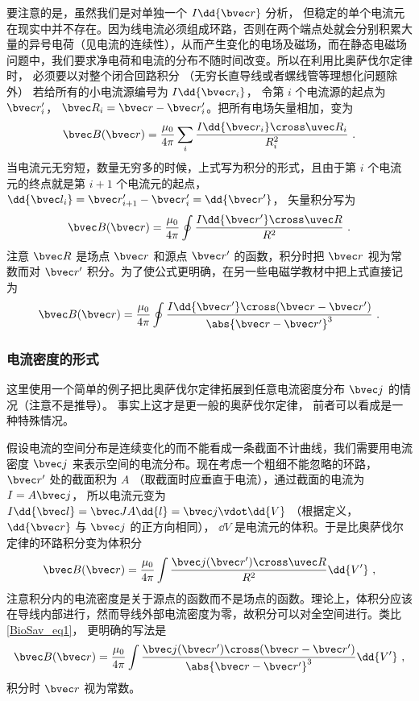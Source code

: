 要注意的是，虽然我们是对单独一个 $I\dd{\bvec r}$ 分析， 但稳定的单个电流元在现实中并不存在。因为线电流必须组成环路，否则在两个端点处就会分别积累大量的异号电荷（见电流的连续性），从而产生变化的电场及磁场，而在静态电磁场问题中，我们要求净电荷和电流的分布不随时间改变。所以在利用比奥萨伐尔定律时， 必须要以对整个闭合回路积分 （无穷长直导线或者螺线管等理想化问题除外）%
若给所有的小电流源编号为 $I\dd{\bvec r_i}$， 令第 $i$ 个电流源的起点为 $\bvec r'_i$， $\bvec R_i = \bvec r - \bvec r'_i$。把所有电场矢量相加，变为
\begin{equation}
\bvec B (\bvec r) = \frac{\mu_0}{4\pi} \sum\limits_i \frac{I \dd{\bvec r_i} \cross \uvec R_i}{R_i^2}~.
\end{equation}
当电流元无穷短，数量无穷多的时候，上式写为积分的形式，且由于第 $i$ 个电流元的终点就是第 $i+1$ 个电流元的起点， $\dd{\bvec l_i} = \bvec r'_{i + 1} - \bvec r'_i = \dd{\bvec r'}$， 矢量积分写为
\begin{equation}\label{BioSav_eq4}
\bvec B (\bvec r) = \frac{\mu_0}{4\pi} \oint \frac{I\dd{\bvec r'} \cross \uvec R}{R^2}~.
\end{equation}
注意 $\bvec R$ 是场点 $\bvec r$ 和源点 $\bvec r'$ 的函数，积分时把 $\bvec r$ 视为常数而对 $\bvec r'$ 积分。为了使公式更明确，在另一些电磁学教材中把上式直接记为
\begin{equation}\label{BioSav_eq1}
\bvec B(\bvec r) = \frac{\mu_0}{4\pi} \oint \frac{I \dd{\bvec r'} \cross (\bvec r - \bvec r')}{\abs{\bvec r - \bvec r'}^3}~.
\end{equation}


\subsubsection{电流密度的形式}
这里使用一个简单的例子把比奥萨伐尔定律拓展到任意电流密度分布 $\bvec j$ 的情况（注意不是推导）。 事实上这才是更一般的奥萨伐尔定律， 前者可以看成是一种特殊情况。

假设电流的空间分布是连续变化的而不能看成一条截面不计曲线，我们需要用电流密度 $\bvec j$ 来表示空间的电流分布。现在考虑一个粗细不能忽略的环路， $\bvec r'$ 处的截面积为 $A$ （取截面时应垂直于电流），通过截面的电流为 $I = A\bvec j$， 所以电流元变为 $I \dd{\bvec l} = \bvec JA \dd{l} = \bvec j \vdot \dd{V}$ （根据定义， $\dd{\bvec r}$ 与 $\bvec j$ 的正方向相同）， $\dd{V}$ 是电流元的体积。于是比奥萨伐尔定律的环路积分变为体积分
\begin{equation}
\bvec B(\bvec r) = \frac{\mu_0}{4\pi} \int \frac{\bvec j(\bvec r') \cross \uvec R}{R^2}\dd{V'}~,
\end{equation}
注意积分内的电流密度是关于源点的函数而不是场点的函数。理论上，体积分应该在导线内部进行，然而导线外部电流密度为零，故积分可以对全空间进行。类比\autoref{BioSav_eq1}， 更明确的写法是
\begin{equation}
\bvec B(\bvec r) = \frac{\mu_0}{4\pi} \int \frac{\bvec j(\bvec r') \cross (\bvec r - \bvec r')}{\abs{\bvec r - \bvec r'}^3} \dd{V'}~,
\end{equation}
积分时 $\bvec r$ 视为常数。

